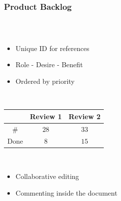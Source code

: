 \begin{frame}
  \frametitle{Product Backlog}
  \begin{columns}
    \begin{column}{0.55\textwidth}
      \begin{description}[]
        \item[Structure] \hfill \\
        \begin{itemize}
          \item Unique ID for references
          \item Role - Desire - Benefit
          \item Ordered by priority
        \end{itemize}
        
        \bigskip
        \item[Progress] \hfill \\
        \begin{tabular}{c | c | c}
           & Review 1 & Review 2\\
          \hline
          $\#$ & $28$ & $33$\\
          Done   & $8$  & $15$        
        \end{tabular}
        
        \bigskip
        \item[Tool: Google Spreadsheet] \hfill \\
        \begin{itemize}
          \item Collaborative editing
          \item Commenting inside the document
        \end{itemize}
      \end{description}
    \end{column}


\end{columns}
\end{frame}
